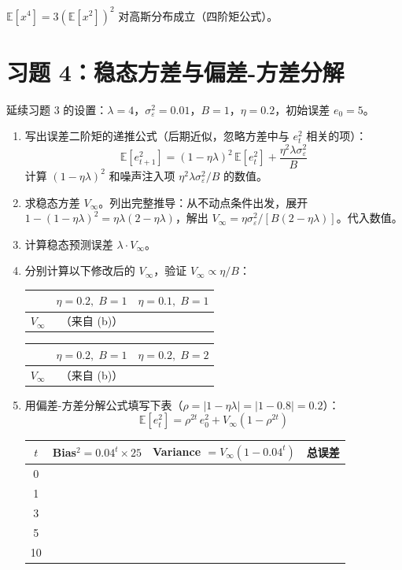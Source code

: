 \documentclass[12pt, a4paper]{ctexart}
\begin{document}
\begin{hint}
$\mathbb{E}[x^4] = 3(\mathbb{E}[x^2])^2$ 对高斯分布成立（四阶矩公式）。
\end{hint}


\section*{习题 4：稳态方差与偏差-方差分解}

延续习题 3 的设置：$\lambda = 4$，$\sigma_\varepsilon^2 = 0.01$，$B = 1$，$\eta = 0.2$，初始误差 $e_0 = 5$。

\begin{enumerate}
    \item[(a)] 写出误差二阶矩的递推公式（后期近似，忽略方差中与 $e_t^2$ 相关的项）：
    \[
    \mathbb{E}[e_{t+1}^2] = (1-\eta\lambda)^2\,\mathbb{E}[e_t^2] + \frac{\eta^2\lambda\sigma_\varepsilon^2}{B}
    \]
    计算 $(1-\eta\lambda)^2$ 和噪声注入项 $\eta^2\lambda\sigma_\varepsilon^2/B$ 的数值。
    
    \item[(b)] 求稳态方差 $V_\infty$。列出完整推导：从不动点条件出发，展开 $1-(1-\eta\lambda)^2 = \eta\lambda(2-\eta\lambda)$，解出 $V_\infty = \eta\sigma_\varepsilon^2/[B(2-\eta\lambda)]$。代入数值。
    
    \item[(c)] 计算稳态预测误差 $\lambda \cdot V_\infty$。
    
    \item[(d)] 分别计算以下修改后的 $V_\infty$，验证 $V_\infty \propto \eta/B$：
    \begin{center}
    \begin{tabular}{c|cc}
    & $\eta = 0.2,\; B = 1$ & $\eta = 0.1,\; B = 1$ \\
    \hline
    $V_\infty$ & （来自 (b)）& \\
    \end{tabular}
    \quad
    \begin{tabular}{c|cc}
    & $\eta = 0.2,\; B = 1$ & $\eta = 0.2,\; B = 2$ \\
    \hline
    $V_\infty$ & （来自 (b)）& \\
    \end{tabular}
    \end{center}
    
    \item[(e)] 用偏差-方差分解公式填写下表（$\rho = |1-\eta\lambda| = |1-0.8| = 0.2$）：
    \[
    \mathbb{E}[e_t^2] = \rho^{2t}\,e_0^2 + V_\infty(1 - \rho^{2t})
    \]
    \begin{center}
    \begin{tabular}{c|ccc}
    $t$ & Bias$^2 = 0.04^t \times 25$ & Variance $= V_\infty(1 - 0.04^t)$ & 总误差 \\
    \hline
    0 & & & \\
    1 & & & \\
    3 & & & \\
    5 & & & \\
    10 & & & \\
    \end{tabular}
    \end{center}
    

\end{enumerate}
\end{document}
